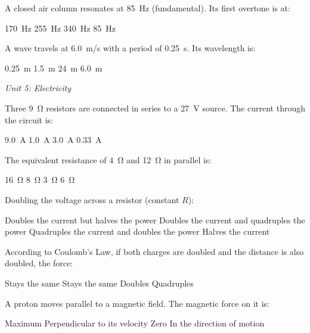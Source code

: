 \documentclass[addpoints]{exam}
\begin{document}
\begin{questions}
\question[1] A closed air column resonates at \SI{85}{Hz} (fundamental). Its first
overtone is at:
\begin{choices}
    \choice \SI{170}{Hz}
    \correctchoice \SI{255}{Hz}
    \choice \SI{340}{Hz}
    \choice \SI{85}{Hz}
\end{choices}

\question[1] A wave travels at \SI{6.0}{m/s} with a period of \SI{0.25}{s}.
Its wavelength is:
\begin{choices}
    \choice \SI{0.25}{m}
    \correctchoice \SI{1.5}{m}
    \choice \SI{24}{m}
    \choice \SI{6.0}{m}
\end{choices}

\vspace{3mm}
\noindent\textit{Unit 5: Electricity}
\vspace{3mm}

\question[1] Three \SI{9}{\ohm} resistors are connected in series to a \SI{27}{V} source.
The current through the circuit is:
\begin{choices}
    \choice \SI{9.0}{A}
    \correctchoice \SI{1.0}{A}
    \choice \SI{3.0}{A}
    \choice \SI{0.33}{A}
\end{choices}

\question[1] The equivalent resistance of \SI{4}{\ohm} and \SI{12}{\ohm} in parallel is:
\begin{choices}
    \choice \SI{16}{\ohm}
    \choice \SI{8}{\ohm}
    \correctchoice \SI{3}{\ohm}
    \choice \SI{6}{\ohm}
\end{choices}

\question[1] Doubling the voltage across a resistor (constant $R$):
\begin{choices}
    \choice Doubles the current but halves the power
    \correctchoice Doubles the current and quadruples the power
    \choice Quadruples the current and doubles the power
    \choice Halves the current
\end{choices}

\question[1] According to Coulomb's Law, if both charges are doubled and the distance
is also doubled, the force:
\begin{choices}
    \choice Stays the same
    \correctchoice Stays the same
    \choice Doubles
    \choice Quadruples
\end{choices}

\question[1] A proton moves parallel to a magnetic field. The magnetic force on it is:
\begin{choices}
    \choice Maximum
    \choice Perpendicular to its velocity
    \correctchoice Zero
    \choice In the direction of motion
\end{choices}


\end{questions}
\end{document}

